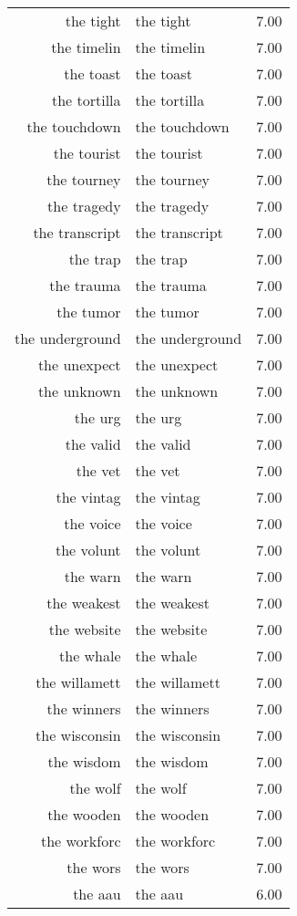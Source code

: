 \begin{table}[ht]
\begin{tabular}{rlr}
  the tight & the tight & 7.00 \\ 
  the timelin & the timelin & 7.00 \\ 
  the toast & the toast & 7.00 \\ 
  the tortilla & the tortilla & 7.00 \\ 
  the touchdown & the touchdown & 7.00 \\ 
  the tourist & the tourist & 7.00 \\ 
  the tourney & the tourney & 7.00 \\ 
  the tragedy & the tragedy & 7.00 \\ 
  the transcript & the transcript & 7.00 \\ 
  the trap & the trap & 7.00 \\ 
  the trauma & the trauma & 7.00 \\ 
  the tumor & the tumor & 7.00 \\ 
  the underground & the underground & 7.00 \\ 
  the unexpect & the unexpect & 7.00 \\ 
  the unknown & the unknown & 7.00 \\ 
  the urg & the urg & 7.00 \\ 
  the valid & the valid & 7.00 \\ 
  the vet & the vet & 7.00 \\ 
  the vintag & the vintag & 7.00 \\ 
  the voice & the voice & 7.00 \\ 
  the volunt & the volunt & 7.00 \\ 
  the warn & the warn & 7.00 \\ 
  the weakest & the weakest & 7.00 \\ 
  the website & the website & 7.00 \\ 
  the whale & the whale & 7.00 \\ 
  the willamett & the willamett & 7.00 \\ 
  the winners & the winners & 7.00 \\ 
  the wisconsin & the wisconsin & 7.00 \\ 
  the wisdom & the wisdom & 7.00 \\ 
  the wolf & the wolf & 7.00 \\ 
  the wooden & the wooden & 7.00 \\ 
  the workforc & the workforc & 7.00 \\ 
  the wors & the wors & 7.00 \\ 
  the aau & the aau & 6.00 \\ 

\end{tabular}
\end{table}

